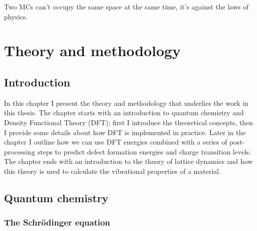 \begin{savequote}[8cm]
Two MCs can't occupy the same space at the same time,
it's against the laws of physics.
\end{savequote}

\chapter{\label{ch:3-methods}Theory and methodology}

\minitoc



\section{Introduction} 

In this chapter I present the theory and methodology that underlies the work in this thesis. The chapter starts with an introduction to quantum chemistry and Density Functional Theory (DFT); first I introduce the theoretical concepts, then I provide some details about how DFT is implemented in practice. Later in the chapter I outline how we can use DFT energies combined with a series of post-processing steps to predict defect formation energies and charge transition levels. The chapter ends with an introduction to the theory of lattice dynamics and how this theory is used to calculate the vibrational properties of a material. 

\section{Quantum chemistry}

\subsection{The Schr\"{o}dinger equation}

